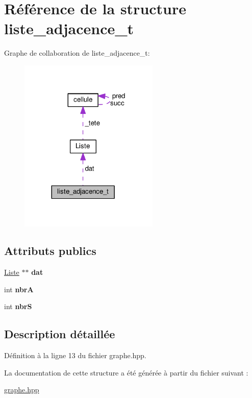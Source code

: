 \hypertarget{structliste__adjacence__t}{\section{Référence de la structure liste\+\_\+adjacence\+\_\+t}
\label{structliste__adjacence__t}
}


Graphe de collaboration de liste\+\_\+adjacence\+\_\+t\+:\nopagebreak
\begin{figure}[H]
\begin{center}
\leavevmode
\includegraphics[width=188pt]{structliste__adjacence__t__coll__graph}
\end{center}
\end{figure}
\subsection*{Attributs publics}
\begin{DoxyCompactItemize}
\item 
\hypertarget{structliste__adjacence__t_aa2ce2755fe745acafa83b31ef058e2bf}{\hyperlink{classListe}{Liste} $\ast$$\ast$ {\bfseries dat}}\label{structliste__adjacence__t_aa2ce2755fe745acafa83b31ef058e2bf}

\item 
\hypertarget{structliste__adjacence__t_a9eb23de3f625a350ee1eec6f7384c8ab}{int {\bfseries nbr\+A}}\label{structliste__adjacence__t_a9eb23de3f625a350ee1eec6f7384c8ab}

\item 
\hypertarget{structliste__adjacence__t_a2b1c14efef06ec98f7c600dc74bb85ca}{int {\bfseries nbr\+S}}\label{structliste__adjacence__t_a2b1c14efef06ec98f7c600dc74bb85ca}

\end{DoxyCompactItemize}


\subsection{Description détaillée}


Définition à la ligne 13 du fichier graphe.\+hpp.



La documentation de cette structure a été générée à partir du fichier suivant \+:\begin{DoxyCompactItemize}
\item 
\hyperlink{graphe_8hpp}{graphe.\+hpp}\end{DoxyCompactItemize}
